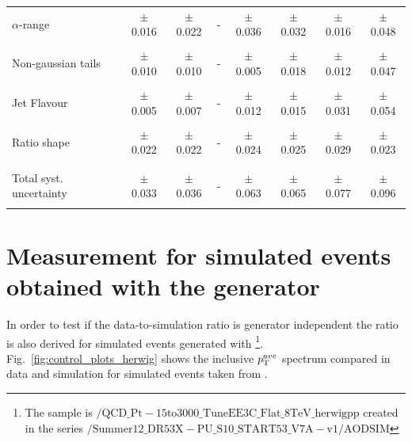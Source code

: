 \begin{table}[!hp]
\begin{tabular}{lcccccccc}
 $\alpha$-range & & $\pm$ 0.016 & $\pm$ 0.022 & - & $\pm$ 0.036 & $\pm$ 0.032 & $\pm$ 0.016 & $\pm$ 0.048 \\
 & & & & & & & & \\
 Non-gaussian tails & & $\pm$ 0.010 & $\pm$ 0.010 & - & $\pm$ 0.005 & $\pm$ 0.018 & $\pm$ 0.012 & $\pm$ 0.047 \\
 & & & & & & & & \\ 
 Jet Flavour & & $\pm$ 0.005 & $\pm$ 0.007 & - & $\pm$ 0.012 & $\pm$ 0.015 & $\pm$ 0.031 & $\pm$ 0.054 \\
 & & & & & & & & \\ 
 Ratio shape & & $\pm$ 0.022 & $\pm$ 0.022 & - & $\pm$ 0.024 & $\pm$ 0.025 & $\pm$ 0.029 & $\pm$ 0.023 \\
 & & & & & & & & \\ 
\hline
 & & & & & & & & \\
 Total syst. uncertainty & & $\pm$ 0.033 & $\pm$ 0.036 & - & $\pm$ 0.063 & $\pm$ 0.065 & $\pm$ 0.077 & $\pm$ 0.096 \\
 & & & & & & & & \\ 
\hline
\end{tabular}%
\end{table}  

\section{Measurement for simulated events obtained with the \herwig generator} 
\label{sec:jer_result_herwig}
In order to test if the data-to-simulation ratio is generator independent the ratio is also derived for simulated events generated with \herwig \footnote{The \herwig sample is $\mathrm{/QCD\_Pt-15to3000\_TuneEE3C\_Flat\_8TeV\_herwigpp}$ created in the series $\mathrm{/Summer12\_DR53X-PU\_S10\_START53\_V7A-v1/AODSIM}$}.\\
Fig.~\ref{fig:control_plots_herwig} shows the inclusive $p_{\text{T}}^{ave}$ spectrum compared in data and simulation for simulated events taken from \herwig. \\

